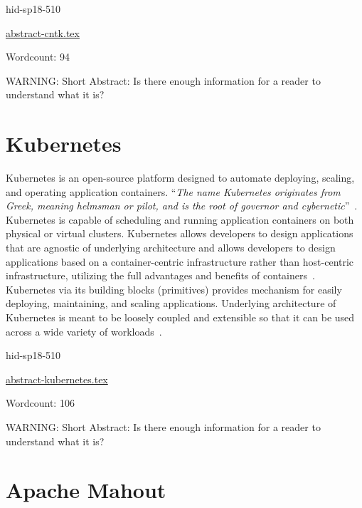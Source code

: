 \begin{IU}

hid-sp18-510

\href{https://github.com/cloudmesh-community/hid-sp18-510/blob/master//technology/abstract-cntk.tex}{abstract-cntk.tex}

 

Wordcount: 94

WARNING: Short Abstract: Is there enough information for a reader to understand what it is?

\end{IU}

\section{Kubernetes}

Kubernetes is an open-source platform designed to automate deploying,
scaling, and operating application containers. \color{blue}``\emph{The name Kubernetes
originates from Greek, meaning helmsman or pilot, and is the root of
governor and cybernetic}''\color{black}~\cite{hid-sp18-510-web-Kubernetes}.
Kubernetes is capable of scheduling and running application containers
on both physical or virtual clusters. Kubernetes allows developers to
design applications that are agnostic of underlying architecture and
allows developers to design applications based on a container-centric
infrastructure rather than host-centric infrastructure, utilizing the
full advantages and benefits of
containers~\cite{hid-sp18-510-med-Kubernetes}. Kubernetes via its
building blocks (primitives) provides mechanism for easily deploying,
maintaining, and scaling applications. Underlying architecture of
Kubernetes is meant to be loosely coupled and extensible so that it
can be used across a wide variety of
workloads~\cite{hid-sp18-510-wiki-Kubernetes}.


\begin{IU}

hid-sp18-510

\href{https://github.com/cloudmesh-community/hid-sp18-510/blob/master//technology/abstract-kubernetes.tex}{abstract-kubernetes.tex}

 

Wordcount: 106

WARNING: Short Abstract: Is there enough information for a reader to understand what it is?

\end{IU}

\section{Apache Mahout}


